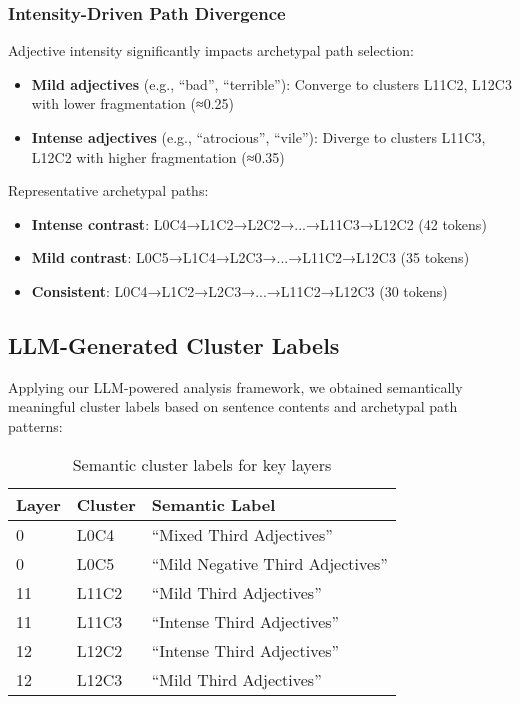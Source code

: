 \subsubsection{Intensity-Driven Path Divergence}

Adjective intensity significantly impacts archetypal path selection:

\begin{itemize}
    \item \textbf{Mild adjectives} (e.g., ``bad'', ``terrible''): Converge to clusters L11C2, L12C3 with lower fragmentation (≈0.25)
    \item \textbf{Intense adjectives} (e.g., ``atrocious'', ``vile''): Diverge to clusters L11C3, L12C2 with higher fragmentation (≈0.35)
\end{itemize}

Representative archetypal paths:
\begin{itemize}
    \item \textbf{Intense contrast}: L0C4→L1C2→L2C2→...→L11C3→L12C2 (42 tokens)
    \item \textbf{Mild contrast}: L0C5→L1C4→L2C3→...→L11C2→L12C3 (35 tokens)  
    \item \textbf{Consistent}: L0C4→L1C2→L2C3→...→L11C2→L12C3 (30 tokens)
\end{itemize}

\subsection{LLM-Generated Cluster Labels}

Applying our LLM-powered analysis framework, we obtained semantically meaningful cluster labels based on sentence contents and archetypal path patterns:

\begin{table}[h!]
\centering
\caption{Semantic cluster labels for key layers}
\label{tab:gpt2_cluster_labels}
\begin{tabular}{lll}
\toprule
Layer & Cluster & Semantic Label \\
\midrule
0 & L0C4 & ``Mixed Third Adjectives'' \\
0 & L0C5 & ``Mild Negative Third Adjectives'' \\
11 & L11C2 & ``Mild Third Adjectives'' \\  
11 & L11C3 & ``Intense Third Adjectives'' \\
12 & L12C2 & ``Intense Third Adjectives'' \\
12 & L12C3 & ``Mild Third Adjectives'' \\
\bottomrule
\end{tabular}
\end{table}

